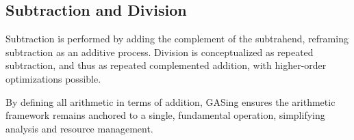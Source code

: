\subsection{Subtraction and Division}
Subtraction is performed by adding the complement of the subtrahend, reframing subtraction as an additive process. Division is conceptualized as repeated subtraction, and thus as repeated complemented addition, with higher-order optimizations possible.

By defining all arithmetic in terms of addition, GASing ensures the arithmetic framework remains anchored to a single, fundamental operation, simplifying analysis and resource management.
